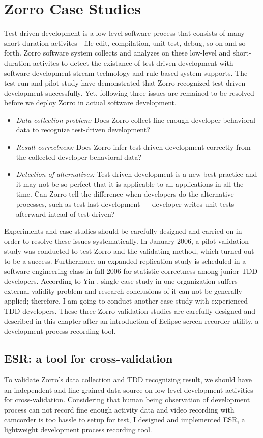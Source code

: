 \chapter{Zorro Case Studies}
\label{ch:evaluation}
Test-driven development is a low-level software process that consists of
many short-duration activites---file edit, compilation, unit test, debug, so
on and so forth. Zorro software system collects and analyzes on these
low-level and short-duration activites to detect the existance of
test-driven development with software development stream technology and
rule-based system supports. The test run and pilot study have demonstrated
that Zorro recognized test-driven development successfully. Yet,
following three issues are remained to be resolved before we deploy Zorro
in actual software development.
\begin{itemize}
\item \textit{Data collection problem:} Does Zorro collect fine enough
  developer behavioral data to recognize test-driven development?
\item \textit{Result correctness:} Does Zorro infer test-driven development
  correctly from the collected developer behavioral data?
\item \textit{Detection of alternatives:} Test-driven development is a new
  best practice and it may not be so perfect that it is applicable to all
  applications in all the time. Can Zorro tell the difference when
  developers do the alternative processes, such as test-last development
  --- developer writes unit tests afterward intead of test-driven?
\end{itemize}
Experiments and case studies should be carefully designed and carried on in
order to resolve these issues systematically. In January 2006, a pilot
validation study was conducted to test Zorro and the validating method,
which turned out to be a success\cite{csdl2-06-02}. Furthermore, an
expanded replication study is scheduled in a software engineering class in
fall 2006 for statistic correctness among junior TDD developers. According
to Yin \cite{Yin:03}, single case study in one organization suffers
external validity problem and research conclusions of it can not be
generally applied; therefore, I am going to conduct another case study with
experienced TDD developers. These three Zorro validation studies are
carefully designed and described in this chapter after an introduction of
Eclipse screen recorder utility\cite{esr}, a development process recording
tool.

\section{ESR: a tool for cross-validation}
\label{sec:esr}
To validate Zorro's data collection and TDD recognizing result, we should
have an independent and fine-grained data source on low-level development
activities for cross-validation. Considering that human being observation
of development process can not record fine enough activity data and video
recording with camcorder is too hassle to setup for test, I designed and
implemented ESR\cite{esr}, a lightweight development process recording
tool.

